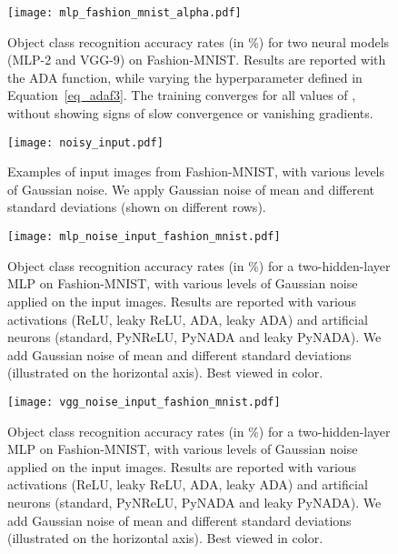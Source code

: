 \documentclass[pdflatex,sn-mathphys]{sn-jnl}
\theoremstyle{thmstyleone}
\theoremstyle{thmstyletwo}\newtheorem{example}{Example}\newtheorem{remark}{Remark}
\theoremstyle{thmstylethree}\newtheorem{definition}{Definition}\DeclareMathOperator{\sinc}{sinc}
\begin{document}
\begin{figure} 
\begin{center}
\centerline{\texttt{[image: mlp\_fashion\_mnist\_alpha.pdf]}}
\caption{Object class recognition accuracy rates (in \%) for two neural models (MLP-2 and VGG-9) on Fashion-MNIST. Results are reported with the ADA function, while varying the hyperparameter  defined in Equation~\eqref{eq_adaf3}. The training converges for all values of , without showing signs of slow convergence or vanishing gradients.}\label{fashion_mnist_ablation_alpha}
\end{center}
\end{figure}

\begin{figure}  
\begin{center}
\centerline{\texttt{[image: noisy\_input.pdf]}}
\caption{Examples of input images from Fashion-MNIST, with various levels of Gaussian noise. We apply Gaussian noise of  mean and different standard deviations (shown on different rows).}\label{noisy_input_samples_fashionmnist} 
\end{center}
\end{figure}

\begin{figure} 
\begin{center}
\centerline{\texttt{[image: mlp\_noise\_input\_fashion\_mnist.pdf]}}
\caption{Object class recognition accuracy rates (in \%) for a two-hidden-layer MLP on Fashion-MNIST, with various levels of Gaussian noise applied on the input images. Results are reported with various activations (ReLU, leaky ReLU, ADA, leaky ADA) and artificial neurons (standard, PyNReLU, PyNADA and leaky PyNADA). We add Gaussian noise of  mean and different standard deviations (illustrated on the horizontal axis). Best viewed in color.}\label{noise_input_mlp_fashion_mnist}
\end{center}
\end{figure}

\begin{figure} 
\begin{center}
\centerline{\texttt{[image: vgg\_noise\_input\_fashion\_mnist.pdf]}}
\caption{Object class recognition accuracy rates (in \%) for a two-hidden-layer MLP on Fashion-MNIST, with various levels of Gaussian noise applied on the input images. Results are reported with various activations (ReLU, leaky ReLU, ADA, leaky ADA) and artificial neurons (standard, PyNReLU, PyNADA and leaky PyNADA). We add Gaussian noise of  mean and different standard deviations (illustrated on the horizontal axis). Best viewed in color.}\label{noise_input_vgg_fashion_mnist}
\end{center}
\end{figure}
\end{document}
